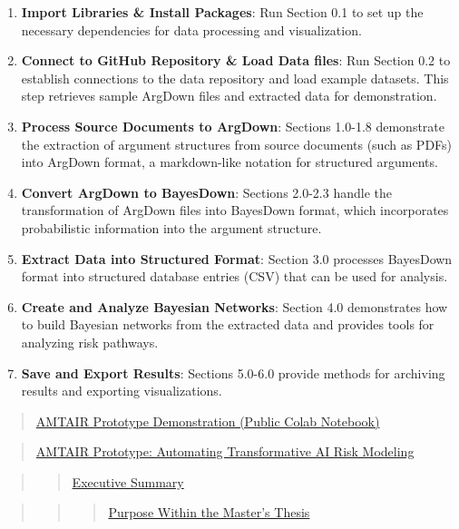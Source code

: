 \documentclass[
  11pt,
  letterpaper,
]{book}
\begin{document}
\begin{enumerate}
\def\labelenumi{\arabic{enumi}.}
\item
  \textbf{Import Libraries \& Install Packages}: Run Section 0.1 to set
  up the necessary dependencies for data processing and visualization.
\item
  \textbf{Connect to GitHub Repository \& Load Data files}: Run Section
  0.2 to establish connections to the data repository and load example
  datasets. This step retrieves sample ArgDown files and extracted data
  for demonstration.
\item
  \textbf{Process Source Documents to ArgDown}: Sections 1.0-1.8
  demonstrate the extraction of argument structures from source
  documents (such as PDFs) into ArgDown format, a markdown-like notation
  for structured arguments.
\item
  \textbf{Convert ArgDown to BayesDown}: Sections 2.0-2.3 handle the
  transformation of ArgDown files into BayesDown format, which
  incorporates probabilistic information into the argument structure.
\item
  \textbf{Extract Data into Structured Format}: Section 3.0 processes
  BayesDown format into structured database entries (CSV) that can be
  used for analysis.
\item
  \textbf{Create and Analyze Bayesian Networks}: Section 4.0
  demonstrates how to build Bayesian networks from the extracted data
  and provides tools for analyzing risk pathways.
\item
  \textbf{Save and Export Results}: Sections 5.0-6.0 provide methods for
  archiving results and exporting visualizations.
\end{enumerate}

\begin{quote}
\hyperref[scrollTo=lt8-AnebGUXr]{AMTAIR Prototype Demonstration (Public
Colab Notebook)}
\end{quote}

\begin{quote}
\hyperref[scrollTo=iDy_leH6DJH_]{AMTAIR Prototype: Automating
Transformative AI Risk Modeling}
\end{quote}

\begin{quote}
\begin{quote}
\hyperref[scrollTo=iDy_leH6DJH_]{Executive Summary}
\end{quote}
\end{quote}

\begin{quote}
\begin{quote}
\begin{quote}
\hyperref[scrollTo=iDy_leH6DJH_]{Purpose Within the Master's Thesis}
\end{quote}
\end{quote}
\end{quote}
\end{document}
